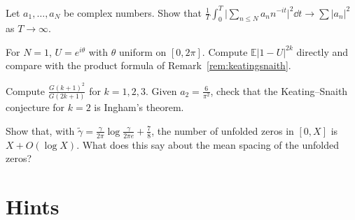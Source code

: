 \begin{exercise}[$\star$]\label{ex:fixedN}
Let $a_1,\dots,a_N$ be complex numbers. Show that $\frac1T\int_0^T\bigl|\sum_{n\le N}a_nn^{-it}\bigr|^2\dd t\to\sum|a_n|^2$ as $T\to\infty$.
\end{exercise}

\begin{exercise}[$\star\star$]\label{ex:cue1}
For $N=1$, $U=e^{i\theta}$ with $\theta$ uniform on $[0,2\pi]$. Compute $\mathbb E|1-U|^{2k}$ directly and compare with the product formula of
Remark~\ref{rem:keatingsnaith}.
\end{exercise}

\begin{exercise}[$\star$]\label{ex:barnes}
Compute $\frac{G(k+1)^2}{G(2k+1)}$ for $k=1,2,3$. Given $a_2=\frac6{\pi^2}$, check that the Keating--Snaith conjecture for $k=2$ is Ingham's theorem.
\end{exercise}

\begin{exercise}[$\star\star$]\label{ex:unfold}
Show that, with $\tilde\gamma=\frac\gamma{2\pi}\log\frac\gamma{2\pi e}+\frac78$, the number of unfolded zeros in $[0,X]$ is $X+O(\log X)$. What does this say about the
mean spacing of the unfolded zeros?
\end{exercise}

\section{Hints}

